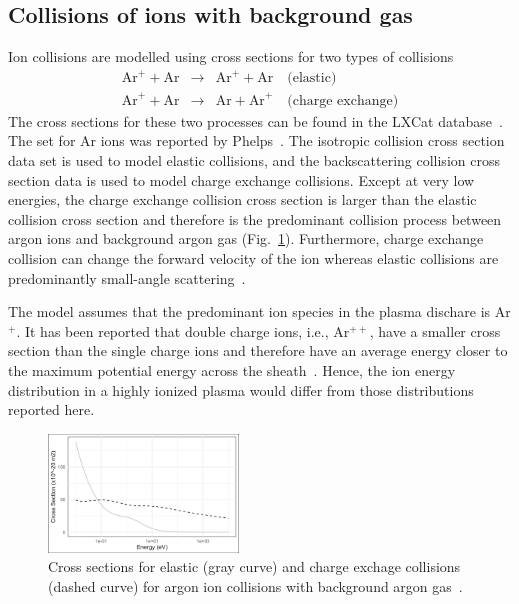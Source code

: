 \subsection{\label{IonCollision}Collisions of ions with background gas}
Ion collisions are modelled using cross sections for two types of collisions
\begin{eqnarray}
\text{Ar}^+ + \text{Ar} &\rightarrow& \text{Ar}^+ + \text{Ar} \quad \text{(elastic)} \\
\text{Ar}^+ + \text{Ar} &\rightarrow& \text{Ar} + \text{Ar}^+ \quad \text{(charge exchange)} 
\end{eqnarray}
The cross sections for these two processes can be found in the LXCat database~\cite{LXCat}. The set for Ar ions was reported by Phelps~\cite{Phelps1994}. The isotropic collision cross section data set is used to model elastic collisions, and the backscattering collision cross section data is used to model charge exchange collisions. Except at very low energies, the charge exchange collision cross section is larger than the elastic collision cross section and therefore is the predominant collision process between argon ions and background argon gas (Fig.~\ref{fig:CrossSectionsArgon}). Furthermore, charge exchange collision can change the forward velocity of the ion whereas elastic collisions are predominantly small-angle scattering~\cite{Davis1963}.

The model assumes that the predominant ion species in the plasma dischare is Ar$^+$. It has been reported that double charge ions, i.e., Ar$^{++}$, have a smaller cross section than the single charge ions and therefore have an average energy closer to the maximum potential energy across the sheath~\cite{Davis1963}. Hence, the ion energy distribution in a highly ionized plasma would differ from those distributions reported here.     
	
\begin{figure}[htbp]
\centering
\includegraphics[width=0.45\textwidth]{Figures/CrossSections.jpg}
\caption{Cross sections for elastic (gray curve) and charge exchage collisions (dashed curve) for argon ion collisions with background argon gas~\cite{Phelps1994,LXCat}.}
\label{fig:CrossSectionsArgon}
\end{figure}


